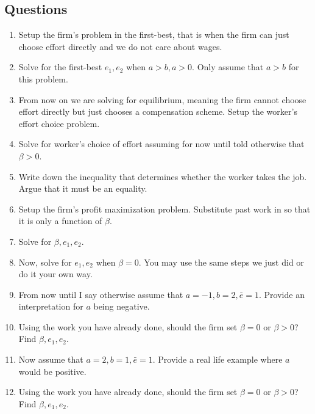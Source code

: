 \documentclass{article}
\begin{document}
\subsection{Questions}
\begin{enumerate}
    \item Setup the firm's problem in the first-best, that is when the firm can just choose effort directly and we do not care about wages.

    \item Solve for the first-best $e_1,e_2$ when $a>b, a>0$. Only assume that $a>b$ for this problem.

 \item From now on we are solving for equilibrium, meaning the firm cannot choose effort directly but just chooses a compensation scheme. Setup the worker's effort choice problem.

 \item Solve for worker's choice of effort assuming for now until told otherwise that $\beta>0$.

 \item Write down the inequality that determines whether the worker takes the job. Argue that it must be an equality.

 \item Setup the firm's profit maximization problem. Substitute past work in so that it is only a function of $\beta$.
 \item Solve for $\beta, e_1,e_2$.

 \item Now, solve for $e_1, e_2$ when $\beta=0$. You may use the same steps we just did or do it your own way.
 
    \item From now until I say otherwise assume that $a=-1, b=2, \bar e=1$. Provide an interpretation for $a$ being negative.

    \item Using the work you have already done, should the firm set $\beta=0$ or $\beta>0$? Find $\beta, e_1, e_2$.

    \item Now assume that $a=2, b=1,\bar e=1$. Provide a real life example where $a$ would be positive.

    \item Using the work you have already done, should the firm set $\beta=0$ or $\beta>0$? Find $\beta, e_1, e_2$.
\end{enumerate}
\end{document}
